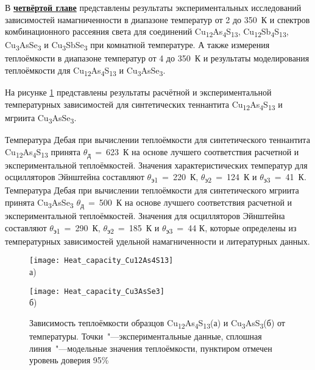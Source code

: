 В \underline{\textbf{четвёртой главе}} представлены результаты экспериментальных исследований зависимостей намагниченности в диапазоне температур от 2 до 350~К и спектров комбинационного рассеяния света для соединений Cu\textsubscript{12}As\textsubscript{4}S\textsubscript{13}, Cu\textsubscript{12}Sb\textsubscript{4}S\textsubscript{13}, Cu\textsubscript{3}AsSe\textsubscript{3} и Cu\textsubscript{3}SbSe\textsubscript{3} при комнатной температуре. А также измерения теплоёмкости в диапазоне температур от 4 до 350~К и результаты моделирования теплоёмкости для Cu\textsubscript{12}As\textsubscript{4}S\textsubscript{13} и Cu\textsubscript{3}AsSe\textsubscript{3}.

На рисунке \ref{img:figure4} представлены результаты расчётной и экспериментальной температурных зависимостей для синтетических теннантита Cu\textsubscript{12}As\textsubscript{4}S\textsubscript{13} и мгриита Cu\textsubscript{3}AsSe\textsubscript{3}.

 Температура Дебая при вычислении теплоёмкости для синтетического теннантита Cu\textsubscript{12}As\textsubscript{4}S\textsubscript{13} принята $\theta$\textsubscript{д}~=~623~К на основе лучшего соответствия расчетной  и экспериментальной  теплоёмкостей. Значения характеристических температур для осцилляторов Эйнштейна составляют $\theta$\textsubscript{э1}~=~220~К, $\theta$\textsubscript{э2}~=~124~К и $\theta$\textsubscript{э3}~=~41~К.
Температура Дебая при вычислении теплоёмкости для синтетического мгриита принята Cu\textsubscript{3}AsSe\textsubscript{3} $\theta$\textsubscript{д}~=~500~К  на основе лучшего соответствия расчетной  и экспериментальной  теплоёмкостей. Значения для осцилляторов Эйнштейна составляют $\theta$\textsubscript{э1}~=~290~К, $\theta$\textsubscript{э2}~=~185~К и $\theta$\textsubscript{э3}~=~44 К, которые определены из температурных зависимостей удельной намагниченности и литературных данных.

\begin{figure}[ht]
  \begin{minipage}[ht]{0.5\linewidth}\centering
    \texttt{[image: Heat\_capacity\_Cu12As4S13]} \\ а)
  \end{minipage}
  \hfill
  \begin{minipage}[ht]{0.5\linewidth}\centering
    \texttt{[image: Heat\_capacity\_Cu3AsSe3]} \\ б)
  \end{minipage}

      \caption[Зависимость теплоёмкости образцов Cu\textsubscript{12}As\textsubscript{4}S\textsubscript{13}(а) и Cu\textsubscript{3}AsS\textsubscript{3}(б) от температуры. Точки~"---экспериментальные данные, сплошная линия~"---модельные значения теплоёмкости, пунктиром отмечен уровень доверия 95\% ]{Зависимость теплоёмкости образцов Cu\textsubscript{12}As\textsubscript{4}S\textsubscript{13}(а) и Cu\textsubscript{3}AsS\textsubscript{3}(б) от температуры. Точки~"---экспериментальные данные, сплошная линия~"---модельные значения теплоёмкости, пунктиром отмечен уровень доверия 95\%}
    \label{img:figure4}
\end{figure}

